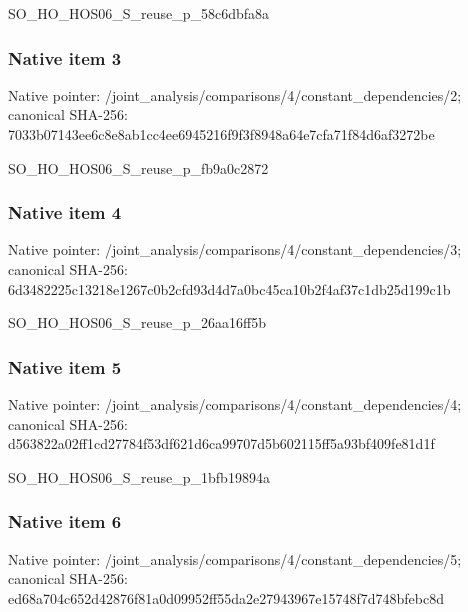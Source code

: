 \documentclass[10pt,a4paper]{article}
\begin{document}
\begingroup\raggedright\sloppy SO\_\allowbreak{}HO\_\allowbreak{}HOS06\_\allowbreak{}S\_\allowbreak{}reuse\_\allowbreak{}p\_\allowbreak{}58c6dbfa8a\par\endgroup

\subsubsection{Native item 3}
Native pointer: /joint\_\allowbreak{}analysis/comparisons/4/constant\_\allowbreak{}dependencies/2; canonical SHA-256: 7033b07143ee6c8e8ab1cc4ee6945216f9f3f8948a64e7cfa71f84d6af3272be

\begingroup\raggedright\sloppy SO\_\allowbreak{}HO\_\allowbreak{}HOS06\_\allowbreak{}S\_\allowbreak{}reuse\_\allowbreak{}p\_\allowbreak{}fb9a0c2872\par\endgroup

\subsubsection{Native item 4}
Native pointer: /joint\_\allowbreak{}analysis/comparisons/4/constant\_\allowbreak{}dependencies/3; canonical SHA-256: 6d3482225c13218e1267c0b2cfd93d4d7a0bc45ca10b2f4af37c1db25d199c1b

\begingroup\raggedright\sloppy SO\_\allowbreak{}HO\_\allowbreak{}HOS06\_\allowbreak{}S\_\allowbreak{}reuse\_\allowbreak{}p\_\allowbreak{}26aa16ff5b\par\endgroup

\subsubsection{Native item 5}
Native pointer: /joint\_\allowbreak{}analysis/comparisons/4/constant\_\allowbreak{}dependencies/4; canonical SHA-256: d563822a02ff1cd27784f53df621d6ca99707d5b602115ff5a93bf409fe81d1f

\begingroup\raggedright\sloppy SO\_\allowbreak{}HO\_\allowbreak{}HOS06\_\allowbreak{}S\_\allowbreak{}reuse\_\allowbreak{}p\_\allowbreak{}1bfb19894a\par\endgroup

\subsubsection{Native item 6}
Native pointer: /joint\_\allowbreak{}analysis/comparisons/4/constant\_\allowbreak{}dependencies/5; canonical SHA-256: ed68a704c652d42876f81a0d09952ff55da2e27943967e15748f7d748bfebc8d
\end{document}
